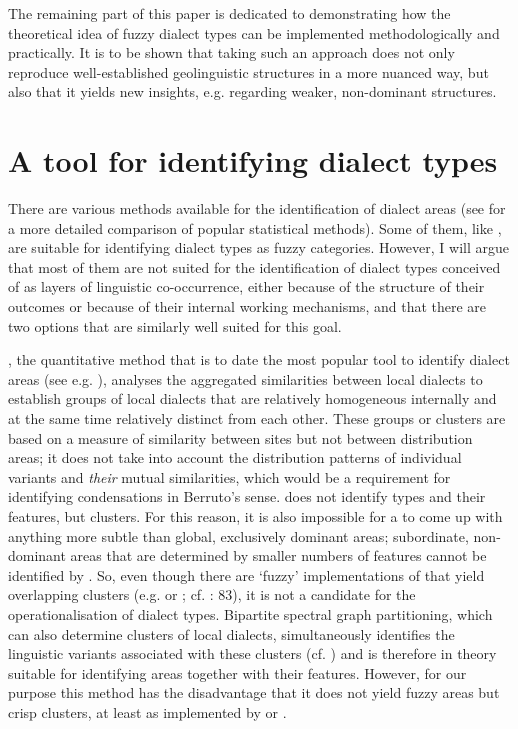 \documentclass[output=paper]{LSP/langsci}
\begin{document}
The remaining part of this paper is dedicated to demonstrating how the theoretical idea of fuzzy dialect types can be implemented methodologically and practically. It is to be shown that taking such an approach does not only reproduce well-established geolinguistic structures in a more nuanced way, but also that it yields new insights, e.g. regarding weaker, non-dominant structures.

\section{A tool for identifying dialect types}
There are various methods available for the identification of dialect areas (see \citealt{grieve_comparison_2014} for a more detailed comparison of popular statistical methods). Some of them, like , are suitable for identifying dialect types as fuzzy categories. However, I will argue that most of them are not suited for the identification of dialect types conceived of as layers of linguistic co-occurrence, either because of the structure of their outcomes or because of their internal working mechanisms, and that there are two options that are similarly well suited for this goal.

\largerpage[-1]
, the quantitative method that is to date the most popular tool to identify dialect areas (see e.g. \citealt[17--29]{goebl_stammbaum_1983,prokic_recognizing_2008,prokic_families_2010}), analyses the aggregated similarities between local dialects to establish groups of local dialects that are relatively homogeneous internally and at the same time relatively distinct from each other. These groups or clusters are based on a measure of similarity between sites but not between distribution areas; it does not take into account the distribution patterns of individual variants and \textit{their} mutual similarities, which would be a requirement for identifying condensations in Berruto’s sense.  does not identify types and their features, but clusters. For this reason, it is also impossible for a  to come up with anything more subtle than global, exclusively dominant areas; subordinate, non-dominant areas that are determined by smaller numbers of features cannot be identified by . So, even though there are ‘fuzzy’ implementations of  that yield overlapping clusters (e.g.  or ; cf. \citealt{nerbonne_gabmap_2011}: 83), it is not a candidate for the operationalisation of dialect types. Bipartite spectral graph partitioning, which can also determine clusters of local dialects, simultaneously identifies the linguistic variants associated with these clusters (cf. \citealt{wieling_bipartite_2011}) and is therefore in theory suitable for identifying areas together with their features. However, for our purpose this method has the disadvantage that it does not yield fuzzy areas but crisp clusters, at least as implemented by \citet{wieling_bipartite_2011} or \citet{wieling_analyzing_2013}. 
\end{document}
